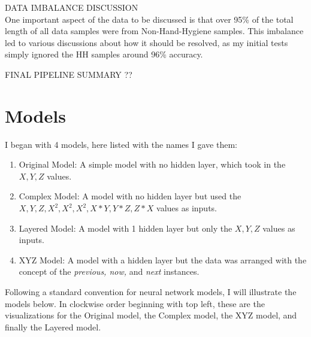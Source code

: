 \documentclass[]{report}
\begin{document}
DATA IMBALANCE DISCUSSION\\
One important aspect of the data to be discussed is that over 95\% of the total length of all data samples were from Non-Hand-Hygiene samples. This imbalance led to various discussions about how it should be resolved, as my initial tests simply ignored the HH samples around 96\% accuracy. 

FINAL PIPELINE SUMMARY ??

\section{Models}

I began with 4 models, here listed with the names I gave them:
\begin{enumerate}
	\item Original Model: A simple model with no hidden layer, which took in the $X,Y,Z$ values.
	\item Complex Model: A model with no hidden layer but used the $X,Y,Z,X^{2},X^{2},X^{2},X*Y,Y*Z,Z*X$ values as inputs.
	\item Layered Model: A model with 1 hidden layer but only the $X,Y,Z$ values as inputs.
	\item XYZ Model: A model with a hidden layer but the data was arranged with the concept of the \textit{previous, now,} and \textit{next} instances.\\
\end{enumerate}

Following a standard convention for neural network models, I will illustrate the models below.
In clockwise order beginning with top left, these are the visualizations for the Original model, the Complex model, the XYZ model, and finally the Layered model.
\end{document}
